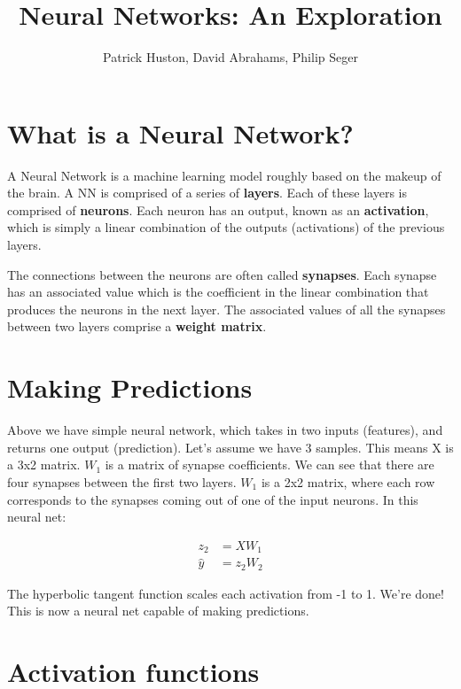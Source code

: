 \documentclass[]{article}
\title{Neural Networks: An Exploration}
\author{Patrick Huston, David Abrahams, Philip Seger}
\begin{document}
\maketitle

\begin{abstract}

\end{abstract}

\section{What is a Neural Network?}

A Neural Network is a machine learning model roughly based on the makeup of the brain. A NN is comprised of a series of \textbf{layers}. Each of these layers is comprised of \textbf{neurons}. Each neuron has an output, known as an \textbf{activation}, which is simply a linear combination of the outputs (activations) of the previous layers.

The connections between the neurons are often called \textbf{synapses}. Each synapse has an associated value which is the coefficient in the linear combination that produces the neurons in the next layer. The associated values of all the synapses between two layers comprise a \textbf{weight matrix}.

\section{Making Predictions}

Above we have simple neural network, which takes in two inputs (features), and returns one output (prediction). Let's assume we have 3 samples. This means X is a 3x2 matrix. $W_1$ is a matrix of synapse coefficients. We can see that there are four synapses between the first two layers. $W_1$ is a 2x2 matrix, where each row corresponds to the synapses coming out of one of the input neurons. In this neural net:

\begin{align}
	z_2 &= X W_1\\
	\hat{y} &= z_2 W_2
\end{align}

The hyperbolic tangent function scales each activation from -1 to 1. We're done! This is now a neural net capable of making predictions.

\section{Activation functions}
\end{document}
